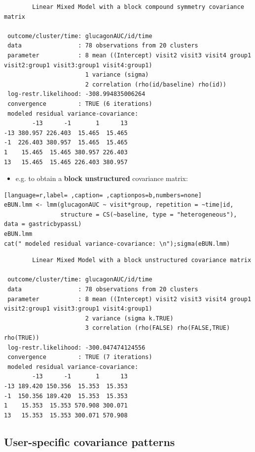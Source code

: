 \documentclass[12pt]{article}
\begin{document}
\begin{verbatim}
		Linear Mixed Model with a block compound symmetry covariance matrix 

 outcome/cluster/time: glucagonAUC/id/time 
 data                : 78 observations from 20 clusters 
 parameter           : 8 mean ((Intercept) visit2 visit3 visit4 group1 visit2:group1 visit3:group1 visit4:group1) 
                       1 variance (sigma) 
                       2 correlation (rho(id/baseline) rho(id)) 
 log-restr.likelihood: -308.994835006264 
 convergence         : TRUE (6 iterations)
 modeled residual variance-covariance: 
        -13      -1       1      13
-13 380.957 226.403  15.465  15.465
-1  226.403 380.957  15.465  15.465
1    15.465  15.465 380.957 226.403
13   15.465  15.465 226.403 380.957
\end{verbatim}

\begin{itemize}
\item e.g. to obtain a \textbf{block unstructured} covariance matrix:
\end{itemize}
\begin{lstlisting}[language=r,label= ,caption= ,captionpos=b,numbers=none]
eBUN.lmm <- lmm(glucagonAUC ~ visit*group, repetition = ~time|id,
                structure = CS(~baseline, type = "heterogeneous"), data = gastricbypassL)
eBUN.lmm
cat(" modeled residual variance-covariance: \n");sigma(eBUN.lmm)
\end{lstlisting}

\begin{verbatim}
		Linear Mixed Model with a block unstructured covariance matrix 

 outcome/cluster/time: glucagonAUC/id/time 
 data                : 78 observations from 20 clusters 
 parameter           : 8 mean ((Intercept) visit2 visit3 visit4 group1 visit2:group1 visit3:group1 visit4:group1) 
                       2 variance (sigma k.TRUE) 
                       3 correlation (rho(FALSE) rho(FALSE,TRUE) rho(TRUE)) 
 log-restr.likelihood: -300.047474124556 
 convergence         : TRUE (7 iterations)
 modeled residual variance-covariance: 
        -13      -1       1      13
-13 189.420 150.356  15.353  15.353
-1  150.356 189.420  15.353  15.353
1    15.353  15.353 570.908 300.071
13   15.353  15.353 300.071 570.908
\end{verbatim}

\clearpage

\subsection{User-specific covariance patterns}
\label{sec:orgc66ff61}
\end{document}
